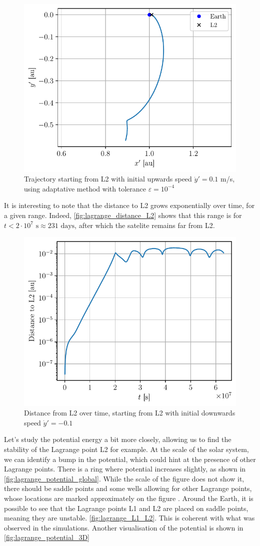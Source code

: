 \begin{figure}[h]
    \centering
    \includegraphics[width=0.6\linewidth]{figures/lagrange_v0_up.pdf}
    \caption{Trajectory starting from L2 with initial upwards speed \(\dot y' = 0.1\) m/s, using adaptative method with tolerance \(\varepsilon = 10^{-4}\)}
    \label{fig:lagrange_v0_up}
\end{figure}

It is interesting to note that the distance to L2 grows exponentially over time, for a given range. Indeed, \autoref{fig:lagrange_distance_L2} shows that this range is for \(t < 2 \cdot 10^7 \textrm{ s} \approx 231 \textrm{ days}\), after which the satelite remains far from L2.

\begin{figure}[h]
    \centering
    \includegraphics[width=0.6\linewidth]{figures/lagrange_exponential_distance.pdf}
    \caption{Distance from L2 over time, starting from L2 with initial downwards speed \(\dot y' = -0.1\)}
    \label{fig:lagrange_distance_L2}
\end{figure}

Let's study the potential energy a bit more closely, allowing us to find the stability of the Lagrange point L2 for example. At the scale of the solar system, we can identify a bump in the potential, which could hint at the presence of other Lagrange points. There is a ring where potential increases slightly, as shown in \autoref{fig:lagrange_potential_global}. While the scale of the figure does not show it, there should be saddle points and some wells allowing for other Lagrange points, whose locations are marked approximately on the figure \cite{lagrange}. Around the Earth, it is possible to see that the Lagrange points L1 and L2 are placed on saddle points, meaning they are unstable. \autoref{fig:lagrange_L1_L2}. This is coherent with what was observed in the simulations. Another visualisation of the potential is shown in \autoref{fig:lagrange_potential_3D}

